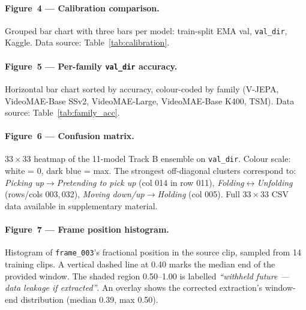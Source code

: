 \documentclass[10pt,twocolumn,letterpaper]{article}
\begin{document}
\paragraph{Figure~4 — Calibration comparison.}
Grouped bar chart with three bars per model:
train-split EMA val, \texttt{val\_dir}, Kaggle.
Data source: Table~\ref{tab:calibration}.

\paragraph{Figure~5 — Per-family \texttt{val\_dir} accuracy.}
Horizontal bar chart sorted by accuracy, colour-coded by family
(V-JEPA, VideoMAE-Base SSv2, VideoMAE-Large, VideoMAE-Base K400, TSM).
Data source: Table~\ref{tab:family_acc}.

\paragraph{Figure~6 — Confusion matrix.}
$33\times33$ heatmap of the 11-model Track B ensemble on \texttt{val\_dir}.
Colour scale: white = 0, dark blue = max. The strongest off-diagonal
clusters correspond to: \emph{Picking up}$\to$\emph{Pretending to pick up}
(col 014 in row 011), \emph{Folding}$\leftrightarrow$\emph{Unfolding}
(rows/cols 003,\,032), \emph{Moving down/up}$\to$\emph{Holding} (col 005).
Full $33\times33$ CSV data available in supplementary material.

\paragraph{Figure~7 — Frame position histogram.}
Histogram of \texttt{frame\_003}'s fractional position in the source clip,
sampled from 14 training clips.  A vertical dashed line at 0.40 marks the
median end of the provided window.  The shaded region 0.50--1.00 is
labelled \emph{``withheld future — data leakage if extracted''}.
An overlay shows the corrected extraction's window-end distribution
(median 0.39, max 0.50).
\end{document}

